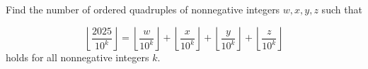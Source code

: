 Find the number of ordered quadruples of nonnegative integers $w,x,y,z$ such that

$$\left\lfloor\dfrac{2025}{10^k}\right\rfloor=\left\lfloor\dfrac{w}{10^k}\right\rfloor+\left\lfloor\dfrac{x}{10^k}\right\rfloor+\left\lfloor\dfrac{y}{10^k}\right\rfloor+\left\lfloor\dfrac{z}{10^k}\right\rfloor$$holds for all nonnegative integers $k$.
